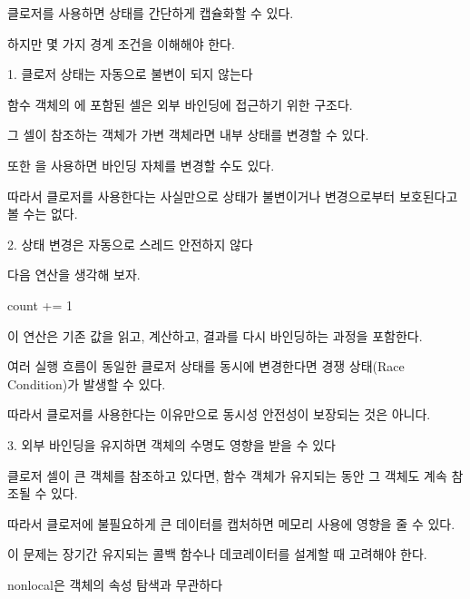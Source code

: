 클로저를 사용하면 상태를 간단하게 캡슐화할 수 있다.

하지만 몇 가지 경계 조건을 이해해야 한다.

\begin{dhknote}
\begin{dhksmry}[centered]
1. 클로저 상태는 자동으로 불변이 되지 않는다
\end{dhksmry}
\end{dhknote}

함수 객체의 에 포함된 셀은 외부 바인딩에 접근하기 위한 구조다.

그 셀이 참조하는 객체가 가변 객체라면 내부 상태를 변경할 수 있다.

또한 을 사용하면 바인딩 자체를 변경할 수도 있다.

따라서 클로저를 사용한다는 사실만으로 상태가 불변이거나 변경으로부터 보호된다고 볼 수는 없다.

\begin{dhknote}
\begin{dhksmry}[centered]
2. 상태 변경은 자동으로 스레드 안전하지 않다
\end{dhksmry}
\end{dhknote}

다음 연산을 생각해 보자.

\begin{dhkcode}
count += 1
\end{dhkcode}

이 연산은 기존 값을 읽고, 계산하고, 결과를 다시 바인딩하는 과정을 포함한다.

여러 실행 흐름이 동일한 클로저 상태를 동시에 변경한다면 경쟁 상태(Race Condition)가 발생할 수 있다.

따라서 클로저를 사용한다는 이유만으로 동시성 안전성이 보장되는 것은 아니다.

\begin{dhknote}
\begin{dhksmry}[centered]
3. 외부 바인딩을 유지하면 객체의 수명도 영향을 받을 수 있다
\end{dhksmry}
\end{dhknote}

클로저 셀이 큰 객체를 참조하고 있다면, 함수 객체가 유지되는 동안 그 객체도 계속 참조될 수 있다.

따라서 클로저에 불필요하게 큰 데이터를 캡처하면 메모리 사용에 영향을 줄 수 있다.

이 문제는 장기간 유지되는 콜백 함수나 데코레이터를 설계할 때 고려해야 한다.

\begin{dhknote}
\begin{dhksmry}[centered]
nonlocal은 객체의 속성 탐색과 무관하다
\end{dhksmry}
\end{dhknote}

